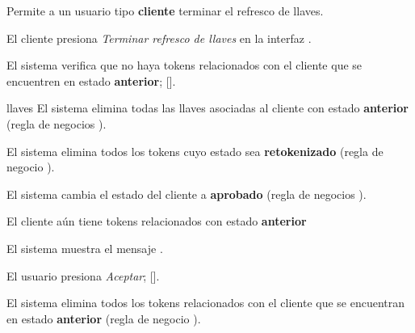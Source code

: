 %
%

{
  Permite a un usuario tipo \textbf{cliente} terminar el refresco de llaves.

  \begin{trayectoriaPrincipal}

    \item El cliente presiona \textit{Terminar refresco de llaves} en la
      interfaz .

    \item El sistema verifica que no haya tokens relacionados con el cliente
      que se encuentren en estado \textbf{anterior};
      [].

    \item[llaves] El sistema elimina todas las llaves asociadas al cliente con
      estado \textbf{anterior} (regla de negocios
      ).

    \item El sistema elimina todos los tokens cuyo estado sea
      \textbf{retokenizado} (regla de negocio
      ).

    \item El sistema cambia el estado del cliente a \textbf{aprobado}
      (regla de negocios ).

  \end{trayectoriaPrincipal}


  \begin{trayectoriaAlternativa}
    {El cliente aún tiene tokens relacionados con estado \textbf{anterior}}

    \item El sistema muestra el mensaje
      .

    \item El usuario presiona \textit{Aceptar};
      [].

    \item El sistema elimina todos los tokens relacionados con el cliente que se
      encuentran en estado \textbf{anterior} (regla de negocio
      ).


\end{trayectoriaAlternativa}}

